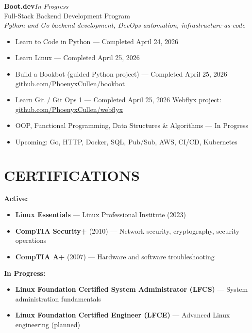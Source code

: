 \documentclass[9pt,letterpaper]{extarticle}
\begin{document}
\vspace{4pt}
\noindent\textbf{Boot.dev}\hfill\textit{In Progress}\\
Full-Stack Backend Development Program\\
\textit{Python and Go backend development, DevOps automation, infrastructure-as-code}
\begin{itemize}
  \item Learn to Code in Python --- Completed April 24, 2026
  \item Learn Linux --- Completed April 25, 2026
  \item Build a Bookbot (guided Python project) --- Completed April 25, 2026 \textbar{} \href{https://github.com/PhoenyxCullen/bookbot}{github.com/PhoenyxCullen/bookbot}
  \item Learn Git / Git Ops 1 --- Completed April 25, 2026 \textbar{} Webflyx project: \href{https://github.com/PhoenyxCullen/webflyx}{github.com/PhoenyxCullen/webflyx}
  \item OOP, Functional Programming, Data Structures \& Algorithms --- In Progress
  \item Upcoming: Go, HTTP, Docker, SQL, Pub/Sub, AWS, CI/CD, Kubernetes
\end{itemize}

\newpage
\section*{CERTIFICATIONS}

\textbf{Active:}
\begin{itemize}
  \item \textbf{Linux Essentials} --- Linux Professional Institute (2023)
  \item \textbf{CompTIA Security+} (2010) --- Network security, cryptography, security operations
  \item \textbf{CompTIA A+} (2007) --- Hardware and software troubleshooting
\end{itemize}

\textbf{In Progress:}
\begin{itemize}
  \item \textbf{Linux Foundation Certified System Administrator (LFCS)} --- System administration fundamentals
  \item \textbf{Linux Foundation Certified Engineer (LFCE)} --- Advanced Linux engineering (planned)
\end{itemize}
\end{document}
